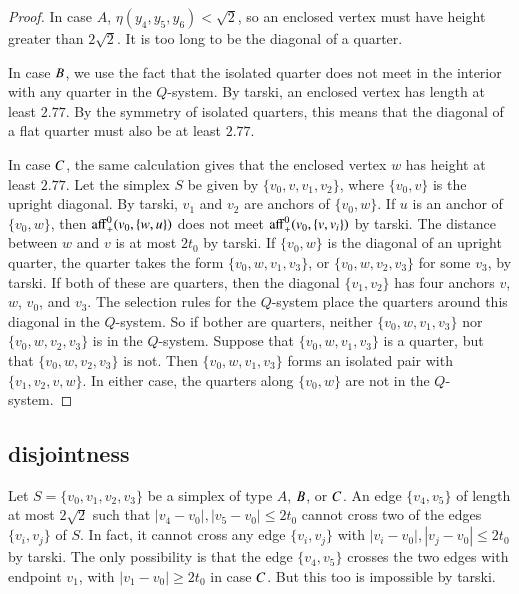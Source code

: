 \begin{proof}
In case $A$, $\eta(y_4,y_5,y_6)<\sqrt{2}$, so an enclosed vertex
must have height greater than $2\sqrt{2}$.  It is too long to be
the diagonal of a quarter.

In case $B$, we use the fact that the isolated quarter does not
meet in the interior with any quarter in the $Q$-system. 
By tarski, an
enclosed vertex has length at least $2.77$.
By the symmetry of isolated quarters, this means that the diagonal
of a flat quarter must also be at least $2.77$.

In case $C$, the same calculation gives that the enclosed vertex
$w$ has height at least $2.77$.  Let the simplex $S$ be given by
$\{v_0,v,v_1,v_2\}$, where $\{v_0,v\}$ is the upright diagonal. By
tarski, $v_1$ and $v_2$ are anchors of
$\{v_0,w\}$. If $u$ is an anchor of $\{v_0,w\}$, then ${\operatorname{aff}}_+^0(v_0,\{w,u\})$
does not meet ${\operatorname{aff}}_+^0(v_0,\{v,v_i\})$ by
tarski. 
The distance between $w$ and $v$ is at most
$2t_0$ by tarski. If $\{v_0,w\}$ is the
diagonal of an upright quarter, the quarter takes the form
$\{v_0,w,v_1,v_3\}$, or $\{v_0,w,v_2,v_3\}$ for some $v_3$, by
tarski. If both of these are quarters, then
the diagonal $\{v_1,v_2\}$ has four anchors $v$, $w$, $v_0$, and
$v_3$. The selection rules for the $Q$-system place the quarters
around this diagonal in the $Q$-system. So if bother are quarters, neither $\{v_0,w,v_1,v_3\}$
nor $\{v_0,w,v_2,v_3\}$ is in the $Q$-system. Suppose that
$\{v_0,w,v_1,v_3\}$ is a quarter, but that $\{v_0,w,v_2,v_3\}$ is not.
Then $\{v_0,w,v_1,v_3\}$ forms an isolated pair with $\{v_1,v_2,v,w\}$.
In either case, the quarters along $\{v_0,w\}$ are not in the
$Q$-system.
\end{proof}

%

\subsection{disjointness}%

Let $S=\{v_0,v_1,v_2,v_3\}$ be a simplex of type $A$, $B$, or
$C$. An edge $\{v_4,v_5\}$ of length at most $2\sqrt{2}$ such
that $|v_4-v_0|,|v_5-v_0|\le 2t_0$ cannot cross two of the edges
$\{v_i,v_j\}$ of $S$.  In fact, it cannot cross any edge $\{v_i,v_j\}$
with $|v_i-v_0|,|v_j-v_0|\le 2t_0$ by tarski.  The
only possibility is that the edge $\{v_4,v_5\}$ crosses the two
edges with endpoint $v_1$, with $|v_1-v_0|\ge2t_0$ in case $C$.  But
this too is impossible by tarski.

